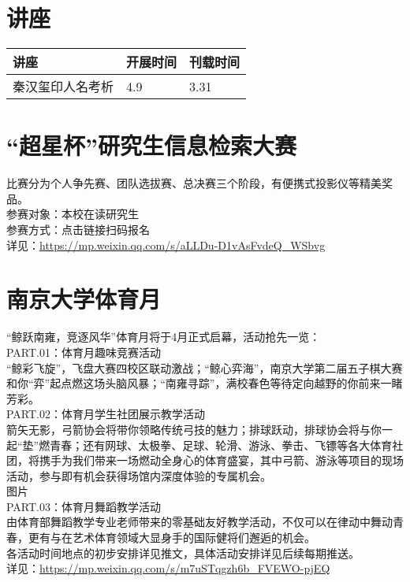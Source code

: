 \documentclass[letterpaper, 12pt]{article}
\begin{document}
\begin{multicols}{2}
\pagebreak

\section{讲座}
\begin{tabular}{|>{\centering\arraybackslash}m{}|m{}|m{}|}
    \hline
    讲座 & 开展时间 & 刊载时间\\
    \hline\hline
    秦汉玺印人名考析 & 4.9 & 3.31\\\hline
\end{tabular}




\section{“超星杯”研究生信息检索大赛}
比赛分为个人争先赛、团队选拔赛、总决赛三个阶段，有便携式投影仪等精美奖品。
\\参赛对象：本校在读研究生
\\参赛方式：点击链接扫码报名
\\详见：\url{https://mp.weixin.qq.com/s/aLLDu-D1vAsFvdeQ_WSbvg}
\section{南京大学体育月}
“鲸跃南雍，竞逐风华”体育月将于4月正式启幕，活动抢先一览：
\\PART.01：体育月趣味竞赛活动
\\“鲸彩飞旋”，飞盘大赛四校区联动激战；“鲸心弈海”，南京大学第二届五子棋大赛和你“弈”起点燃这场头脑风暴；“南雍寻踪”，满校春色等待定向越野的你前来一睹芳彩。
\\PART.02：体育月学生社团展示教学活动
\\箭矢无影，弓箭协会将带你领略传统弓技的魅力；排球跃动，排球协会将与你一起“垫”燃青春；还有网球、太极拳、足球、轮滑、游泳、拳击、飞镖等各大体育社团，将携手为我们带来一场燃动全身心的体育盛宴，其中弓箭、游泳等项目的现场活动，参与即有机会获得场馆内深度体验的专属机会。
\\图片
\\PART.03：体育月舞蹈教学活动
\\由体育部舞蹈教学专业老师带来的零基础友好教学活动，不仅可以在律动中舞动青春，更有与在艺术体育领域大显身手的国际健将们邂逅的机会。
\\各活动时间地点的初步安排详见推文，具体活动安排详见后续每期推送。
\\详见：\url{https://mp.weixin.qq.com/s/m7uSTqgzh6b_FVEWO-pjEQ}


\end{multicols}
\end{document}
